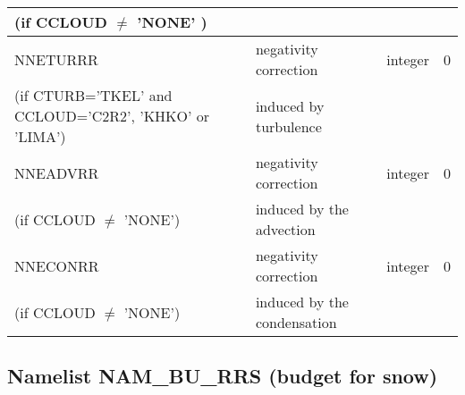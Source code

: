 \begin{longtable} {|p{}|p{}|>{\centering}p{}|p{}<{\centering}|}
(if CCLOUD $\neq$ 'NONE' )& &   &  \\\hline
NNETURRR  &negativity correction   & integer  &  0 \index{NNETURRR!\innam{NAM\_BU\_RRR}}\\ \nopagebreak
(if CTURB='TKEL' and CCLOUD='C2R2', 'KHKO' or 'LIMA')   &induced by turbulence   &       &   \\\hline
NNEADVRR  & negativity correction  & integer  &  0 \index{NNEADVRR!\innam{NAM\_BU\_RRR}}\\ \nopagebreak
(if CCLOUD $\neq$ 'NONE') & induced by the advection&   &  \\\hline
NNECONRR  &negativity correction    & integer  &  0 \index{NNECONRR!\innam{NAM\_BU\_RRR}}\\ \nopagebreak
(if CCLOUD $\neq$ 'NONE') &induced by the condensation &   &  \\\hline
\end{longtable}

\subsection{Namelist NAM\_BU\_RRS (budget for snow)}

